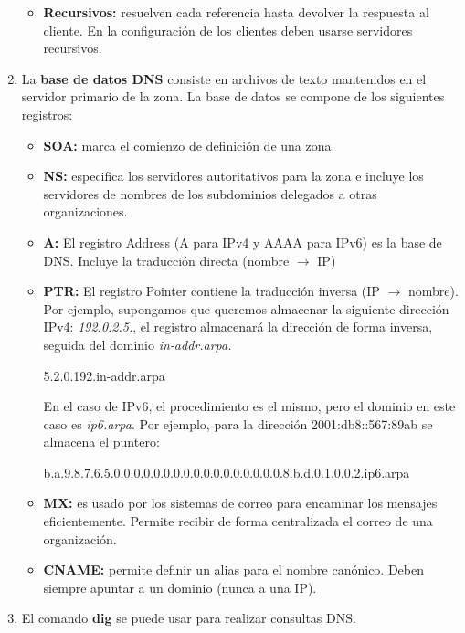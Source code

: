 \begin{enumerate}
\begin{itemize}
        \item \textbf{Recursivos: }resuelven cada referencia hasta devolver la respuesta al cliente. En la configuración de los clientes deben usarse servidores recursivos.
    \end{itemize}
    \item La \textbf{base de datos DNS} consiste en archivos de texto  mantenidos en el servidor primario de la zona. La base de datos se compone de los siguientes registros:
    \begin{itemize}
        \item \textbf{SOA: }marca el comienzo de definición de una zona.
        \item \textbf{NS: }especifica los servidores autoritativos para la zona e incluye los servidores de nombres de los subdominios delegados a otras organizaciones.
        \item \textbf{A: }El registro Address (A para IPv4 y AAAA para IPv6) es la base de DNS. Incluye la traducción directa (nombre $\rightarrow$ IP)
        \item \textbf{PTR: }El registro Pointer contiene la traducción inversa (IP $\rightarrow$ nombre). Por ejemplo, supongamos que queremos almacenar la siguiente dirección IPv4: \textit{192.0.2.5.}, el registro almacenará la dirección de forma inversa, seguida del dominio \textit{in-addr.arpa.}
        \begin{center}
            5.2.0.192.in-addr.arpa
        \end{center}
        En el caso de IPv6, el procedimiento es el mismo, pero el dominio en este caso es \textit{ip6.arpa}. Por ejemplo, para la dirección 2001:db8::567:89ab se almacena el puntero:
        \begin{center}
            b.a.9.8.7.6.5.0.0.0.0.0.0.0.0.0.0.0.0.0.0.0.0.0.8.b.d.0.1.0.0.2.ip6.arpa
        \end{center}
        \item \textbf{MX: }es usado por los sistemas de correo para encaminar los mensajes eficientemente. Permite recibir de forma centralizada el correo de una organización.
        \item \textbf{CNAME: } permite definir un alias para el nombre canónico. Deben siempre apuntar a un dominio (nunca a una IP).
    \end{itemize}
    \item El comando \textbf{dig} se puede usar para realizar consultas DNS.
\end{enumerate}
